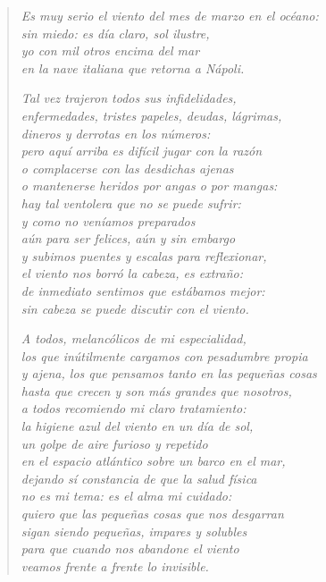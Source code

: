 \documentclass[12pt]{article}
\begin{document}
\clearpage
{}
\begin{verse}

\emph{Es muy serio el viento del mes de marzo en el océano:\\
sin miedo: es día claro, sol ilustre,\\
yo con mil otros encima del mar\\
en la nave italiana que retorna a Nápoli.}  

\emph{Tal vez trajeron todos sus infidelidades,\\
enfermedades, tristes papeles, deudas, lágrimas,\\
dineros y derrotas en los números:\\
pero aquí arriba es difícil jugar con la razón\\
o complacerse con las desdichas ajenas\\
o mantenerse heridos por angas o por mangas:\\
hay tal ventolera que no se puede sufrir:\\
y como no veníamos preparados\\
aún para ser felices, aún y sin embargo\\
y subimos puentes y escalas para reflexionar,\\
el viento nos borró la cabeza, es extraño:\\
de inmediato sentimos que estábamos mejor:\\
sin cabeza se puede discutir con el viento.}  

\emph{A todos, melancólicos de mi especialidad,\\
los que inútilmente cargamos con pesadumbre propia\\
y ajena, los que pensamos tanto en las pequeñas cosas\\
hasta que crecen y son más grandes que nosotros,\\
a todos recomiendo mi claro tratamiento:\\
la higiene azul del viento en un día de sol,\\
un golpe de aire furioso y repetido\\
en el espacio atlántico sobre un barco en el mar,\\
dejando sí constancia de que la salud física\\
no es mi tema: es el alma mi cuidado:\\
quiero que las pequeñas cosas que nos desgarran\\
sigan siendo pequeñas, impares y solubles\\
para que cuando nos abandone el viento\\
veamos frente a frente lo invisible.}  

\end{verse}
\end{document}
